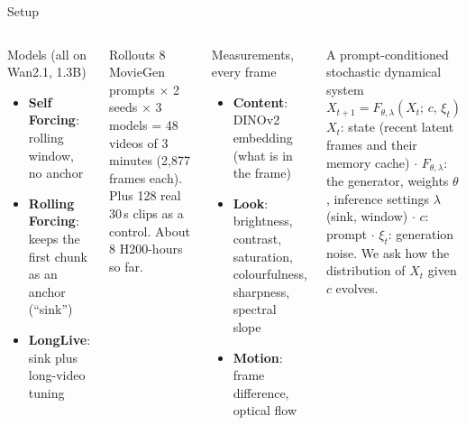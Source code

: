 \documentclass[aspectratio=169,10pt]{beamer}
\begin{document}
\begin{frame}{Setup}
\begin{columns}[T]
\begin{block}{Models (all on Wan2.1, 1.3B)}
\begin{itemize}\small
  \item \textbf{Self Forcing}: rolling window, no anchor
  \item \textbf{Rolling Forcing}: keeps the first chunk as an anchor (``sink'')
  \item \textbf{LongLive}: sink plus long-video tuning
\end{itemize}
\end{block}
\begin{block}{Rollouts}
\small 8 MovieGen prompts $\times$ 2 seeds $\times$ 3 models = 48 videos of 3 minutes (2{,}877 frames each). Plus 128 real 30\,s clips as a control. About 8 H200-hours so far.
\end{block}
\begin{block}{Measurements, every frame}
\begin{itemize}\small
  \item \textbf{Content}: DINOv2 embedding (what is in the frame)
  \item \textbf{Look}: brightness, contrast, saturation, colourfulness, sharpness, spectral slope
  \item \textbf{Motion}: frame difference, optical flow
\end{itemize}
\end{block}
\begin{block}{A prompt-conditioned stochastic dynamical system}
\small $X_{t+1} = F_{\theta,\lambda}(X_t;\, c,\, \xi_t)$\\[2pt]
\footnotesize $X_t$: state (recent latent frames and their memory cache) $\cdot$ $F_{\theta,\lambda}$: the generator, weights $\theta$, inference settings $\lambda$ (sink, window) $\cdot$ $c$: prompt $\cdot$ $\xi_t$: generation noise. We ask how the distribution of $X_t$ given $c$ evolves.
\end{block}
\end{columns}
\end{frame}
\end{document}
